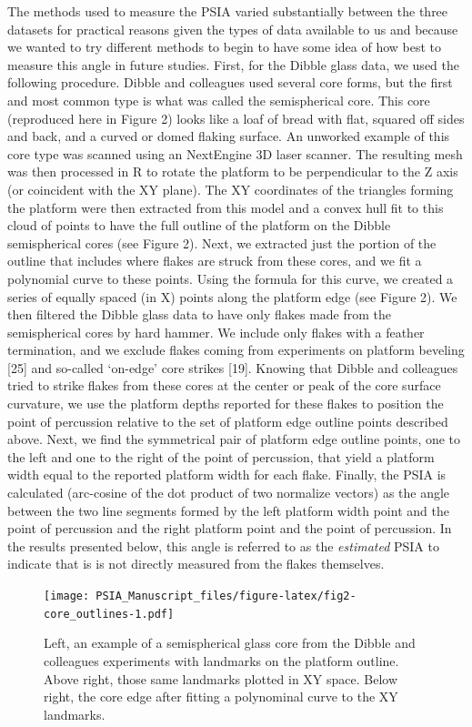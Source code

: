 \documentclass[10pt,letterpaper]{article}
\begin{document}
The methods used to measure the PSIA varied substantially between the
three datasets for practical reasons given the types of data available
to us and because we wanted to try different methods to begin to have
some idea of how best to measure this angle in future studies. First,
for the Dibble glass data, we used the following procedure. Dibble and
colleagues used several core forms, but the first and most common type
is what was called the semispherical core. This core (reproduced here in
Figure 2) looks like a loaf of bread with flat, squared off sides and
back, and a curved or domed flaking surface. An unworked example of this
core type was scanned using an NextEngine 3D laser scanner. The
resulting mesh was then processed in R to rotate the platform to be
perpendicular to the Z axis (or coincident with the XY plane). The XY
coordinates of the triangles forming the platform were then extracted
from this model and a convex hull fit to this cloud of points to have
the full outline of the platform on the Dibble semispherical cores (see
Figure 2). Next, we extracted just the portion of the outline that
includes where flakes are struck from these cores, and we fit a
polynomial curve to these points. Using the formula for this curve, we
created a series of equally spaced (in X) points along the platform edge
(see Figure 2). We then filtered the Dibble glass data to have only
flakes made from the semispherical cores by hard hammer. We include only
flakes with a feather termination, and we exclude flakes coming from
experiments on platform beveling {[}25{]} and so-called `on-edge' core
strikes {[}19{]}. Knowing that Dibble and colleagues tried to strike
flakes from these cores at the center or peak of the core surface
curvature, we use the platform depths reported for these flakes to
position the point of percussion relative to the set of platform edge
outline points described above. Next, we find the symmetrical pair of
platform edge outline points, one to the left and one to the right of
the point of percussion, that yield a platform width equal to the
reported platform width for each flake. Finally, the PSIA is calculated
(arc-cosine of the dot product of two normalize vectors) as the angle
between the two line segments formed by the left platform width point
and the point of percussion and the right platform point and the point
of percussion. In the results presented below, this angle is referred to
as the \emph{estimated} PSIA to indicate that is is not directly
measured from the flakes themselves.

\begin{figure}
\centering
\texttt{[image: PSIA\_Manuscript\_files/figure-latex/fig2-core\_outlines-1.pdf]}
\caption{Left, an example of a semispherical glass core from the Dibble
and colleagues experiments with landmarks on the platform outline. Above
right, those same landmarks plotted in XY space. Below right, the core
edge after fitting a polynominal curve to the XY landmarks.}
\end{figure}
\end{document}
